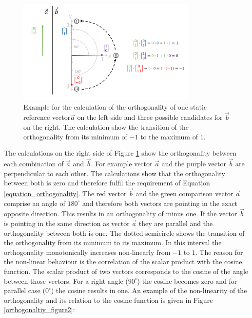 \begin{figure}[H]
    \centering
    \includegraphics[width=0.8\textwidth]{Graphics/orthogonality.png}
    \caption{Example for the calculation of the orthogonality of one static reference vector$\overrightarrow{a}$ on the left side and three possible candidates for $\overrightarrow{b}$ on the right. The calculation show the transition of the orthogonality from its minimum of $-1$ to the maximum of $1$.}
    \label{orthogonaltiy_figure}
\end{figure}

The calculations on the right side of Figure \ref{orthogonaltiy_figure} show the orthogonality between each combination of $\overrightarrow{a}$ and $\overrightarrow{b}$. For example vector $\overrightarrow{a}$ and the purple vector $\overrightarrow{b}$ are perpendicular to each other. The calculations show that the orthogonality between both is zero and therefore fulfil the requirement of Equation \ref{equation_orthogonality}. The red vector $\overrightarrow{b}$ and the green comparison vector $\overrightarrow{a}$ comprise an angle of $180^{\circ}$ and therefore both vectors are pointing in the exact opposite direction. This results in an orthogonality of minus one.
If the vector $\overrightarrow{b}$ is pointing in the same direction as vector $\overrightarrow{a}$ they are parallel and the orthogonality between both is one. The dotted semicircle shows the transition of the orthogonality from its minimum to its maximum. In this interval the orthogonality monotonically increases non-linearly from $-1$ to $1$. The reason for the non-linear behaviour is the correlation of the scalar product with the cosine function. The scalar product of two vectors corresponds to the cosine of the angle between those vectors. For a right angle ($90^{\circ}$) the cosine becomes zero and for parallel case ($0^{\circ}$) the cosine results in one. An example of the non-linearity of the orthogonality and its relation to the cosine function is given in Figure \ref{orthogonaltiy_figure2}:

